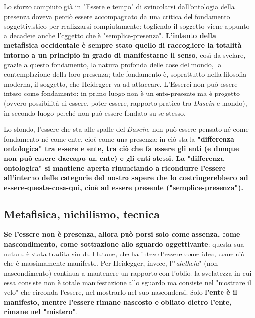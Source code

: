 Lo sforzo compiuto già in "Essere e tempo" di svincolarsi
dall'ontologia della presenza doveva perciò essere accompagnato da una critica del fondamento soggettivistico per
realizzarsi compiutamente: togliendo il soggetto viene appunto a decadere anche l'oggetto che è "semplice-presenza". \textbf{L'intento della metafisica
occidentale è sempre stato quello di raccogliere la
totalità intorno a un principio in grado
di manifestarne il senso}, così da svelare, grazie a
questo fondamento, la natura profonda delle cose del
mondo, la contemplazione della loro presenza; tale
fondamento è, soprattutto nella filosofia moderna, il
soggetto, che Heidegger va ad attaccare.
L'Esserci non può essere inteso come fondamento: in
primo luogo non è un ente-presente ma è progetto
(ovvero possibilità di essere, poter-essere, rapporto pratico tra \textit{Dasein} e mondo), in secondo luogo
perché non può essere fondato su se stesso.

Lo sfondo, l'essere che sta alle spalle del \textit{Dasein},
non può essere pensato né come fondamento né
come ente, cioè come una presenza: in ciò sta
la \textbf{"differenza ontologica" tra essere e ente, tra
ciò che fa essere gli enti (e dunque non può essere
daccapo un ente) e gli enti stessi.
La "differenza ontologica" si mantiene aperta rinunciando
a ricondurre l'essere all'interno delle categorie del
nostro sapere che lo costringerebbero ad
essere-questa-cosa-qui, cioè ad essere presente ("semplice-presenza").}

\subsection{Metafisica, nichilismo, tecnica}

\textbf{Se l'essere non è presenza, allora può porsi solo
come assenza, come nascondimento, come sottrazione
allo sguardo oggettivante}: questa sua natura è stata
tradita sin da Platone, che ha inteso l'essere
come idea, come ciò che è massimamente manifesto.
Per Heidegger, invece, l'"\textit{aletheia}" (non-nascondimento)
continua a mantenere un rapporto con l'oblio: la
svelatezza in cui essa consiste non è totale
manifestazione allo sguardo ma consiste nel
"mostrare il velo" che circonda l'essere, nel
mostrarlo nel suo nascondersi. Solo \textbf{l'ente è il
manifesto, mentre l'essere rimane nascosto e
obliato dietro l'ente, rimane nel "mistero"}.

